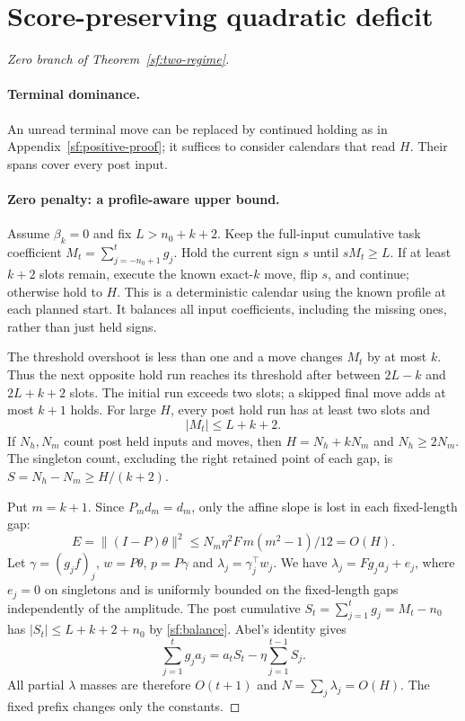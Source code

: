 \section{Score-preserving quadratic deficit}\label{sf:zero-proof}
\begin{proof}[Zero branch of Theorem~\ref{sf:two-regime}]
\paragraph{Terminal dominance.} An unread terminal move can be replaced
by continued holding as in Appendix~\ref{sf:positive-proof}; it suffices to
consider calendars that read $H$. Their spans cover every post input.

\paragraph{Zero penalty: a profile-aware upper bound.}
Assume $\beta_k=0$ and fix $L>n_0+k+2$.
Keep the full-input cumulative task coefficient
$M_t=\sum_{j=-n_0+1}^t g_j$.
Hold the current sign $s$ until $sM_t\ge L$.
If at least $k+2$ slots remain, execute the known exact-$k$ move,
flip $s$, and continue; otherwise hold to $H$.
This is a deterministic calendar using the known profile at each
planned start. It balances all input coefficients, including the
missing ones, rather than just held signs.

The threshold overshoot is less than one and a move changes $M_t$
by at most $k$. Thus the next opposite hold run reaches its threshold
after between $2L-k$ and $2L+k+2$ slots.
The initial run exceeds two slots; a skipped final move adds at most
$k+1$ holds. For large $H$, every post hold run has at least two
slots and
\begin{equation}\label{sf:balance}
|M_t|\le L+k+2 .
\end{equation}
If $N_h,N_m$ count post held inputs and moves, then
$H=N_h+kN_m$ and $N_h\ge2N_m$.
The singleton count, excluding the right retained point of each gap,
is $S=N_h-N_m\ge H/(k+2)$.

Put $m=k+1$. Since $P_md_m=d_m$, only the affine slope is lost
in each fixed-length gap:
\begin{equation}\label{sf:slope-loss}
E=\|(I-P)\theta\|^2\le
N_m\eta^2F\,m(m^2-1)/12=O(H).
\end{equation}
Let $\gamma=(g_jf)_j$, $w=P\theta$, $p=P\gamma$ and
$\lambda_j=\gamma_j^\top w_j$.
We have $\lambda_j=Fg_ja_j+e_j$, where $e_j=0$ on singletons
and is uniformly bounded on the fixed-length gaps independently
of the amplitude. The post cumulative $S_t=\sum_{j=1}^tg_j=M_t-n_0$
has $|S_t|\le L+k+2+n_0$ by \eqref{sf:balance}. Abel's identity gives
\[
\sum_{j=1}^t g_ja_j=a_tS_t-\eta\sum_{j=1}^{t-1}S_j .
\]
All partial $\lambda$ masses are therefore $O(t+1)$ and
$N=\sum_j\lambda_j=O(H)$. The fixed prefix changes only the constants.


\end{proof}
